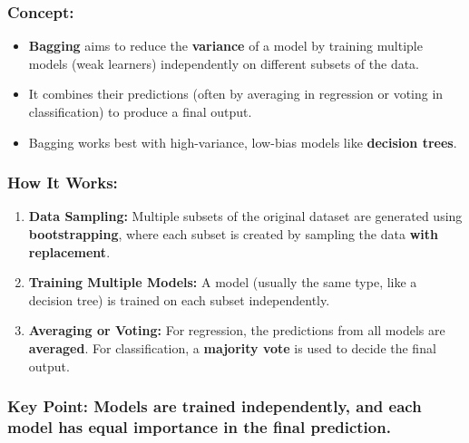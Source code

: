 \documentclass[12pt]{book}
\providecommand{\tightlist}{%
  \setlength{\itemsep}{0pt}\setlength{\parskip}{0pt}}
\begin{document}
\subsubsection{\texorpdfstring{\textbf{Concept:}}{Concept:}}\label{concept}

\begin{itemize}
\tightlist
\item
  \textbf{Bagging} aims to reduce the \textbf{variance} of a model by
  training multiple models (weak learners) independently on different
  subsets of the data.
\item
  It combines their predictions (often by averaging in regression or
  voting in classification) to produce a final output.
\item
  Bagging works best with high-variance, low-bias models like
  \textbf{decision trees}.
\end{itemize}

\subsubsection{\texorpdfstring{\textbf{How It
Works:}}{How It Works:}}\label{how-it-works}

\begin{enumerate}
\def\labelenumi{\arabic{enumi}.}
\tightlist
\item
  \textbf{Data Sampling:} Multiple subsets of the original dataset are
  generated using \textbf{bootstrapping}, where each subset is created
  by sampling the data \textbf{with replacement}.
\item
  \textbf{Training Multiple Models:} A model (usually the same type,
  like a decision tree) is trained on each subset independently.
\item
  \textbf{Averaging or Voting:} For regression, the predictions from all
  models are \textbf{averaged}. For classification, a \textbf{majority
  vote} is used to decide the final output.
\end{enumerate}

\subsubsection{\texorpdfstring{\textbf{Key Point:} Models are trained
\textbf{independently}, and each model has \textbf{equal importance} in
the final
prediction.}{Key Point: Models are trained independently, and each model has equal importance in the final prediction.}}\label{key-point-models-are-trained-independently-and-each-model-has-equal-importance-in-the-final-prediction.}
\end{document}

